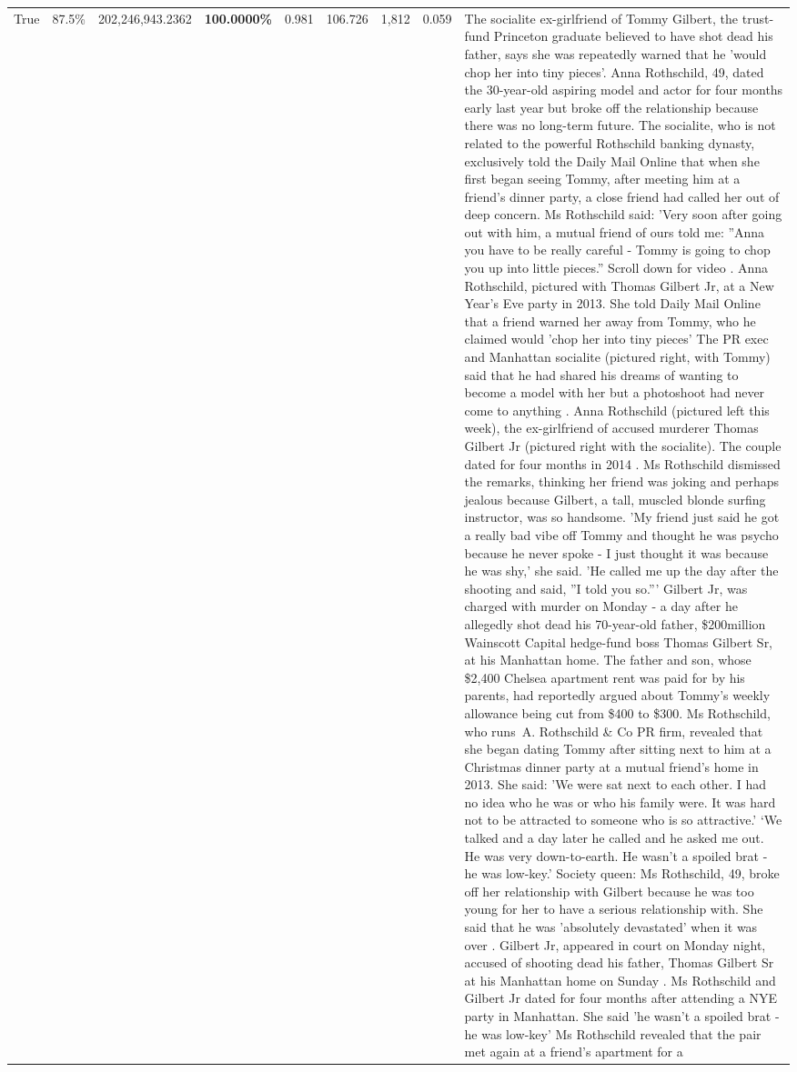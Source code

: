 \begin{table}[H]
\begin{tabular}{lllrlllll}
True & 87.5\% & 202,246,943.2362 & \bfseries \color{red} 100.0000\% & 0.981 & 106.726 & 1,812 & 0.059 & The socialite ex-girlfriend of Tommy Gilbert, the trust-fund Princeton graduate believed to have shot dead his father, says she was repeatedly warned that he 'would chop her into tiny pieces'. Anna Rothschild, 49, dated the 30-year-old aspiring model and actor for four months early last year but broke off the relationship because there was no long-term future. The socialite, who is not related to the powerful Rothschild banking dynasty, exclusively told the Daily Mail Online that when she first began seeing Tommy, after meeting him at a friend's dinner party, a close friend had called her out of deep concern. Ms Rothschild said: 'Very soon after going out with him, a mutual friend of ours told me: ''Anna you have to be really careful - Tommy is going to chop you up into little pieces.'' Scroll down for video . Anna Rothschild, pictured with Thomas Gilbert Jr, at a New Year's Eve party in 2013. She told Daily Mail Online that a friend warned her away from Tommy, who he claimed would 'chop her into tiny pieces' The PR exec and Manhattan socialite (pictured right, with Tommy) said that he had shared his dreams of wanting to become a model with her but a photoshoot had never come to anything . Anna Rothschild (pictured left this week), the ex-girlfriend of accused murderer Thomas Gilbert Jr (pictured right with the socialite). The couple dated for four months in 2014 . Ms Rothschild dismissed the remarks, thinking her friend was joking and perhaps jealous because Gilbert, a tall, muscled blonde surfing instructor, was so handsome. 'My friend just said he got a really bad vibe off Tommy and thought he was psycho because he never spoke - I just thought it was because he was shy,' she said. 'He called me up the day after the shooting and said, ''I told you so.''' Gilbert Jr, was charged with murder on Monday - a day after he allegedly shot dead his 70-year-old father, \$200million Wainscott Capital hedge-fund boss Thomas Gilbert Sr, at his Manhattan home. The father and son, whose \$2,400 Chelsea apartment rent was paid for by his parents, had reportedly argued about Tommy's weekly allowance being cut from \$400 to \$300. Ms Rothschild, who runs A. Rothschild \& Co PR firm, revealed that she began dating Tommy after sitting next to him at a Christmas dinner party at a mutual friend's home in 2013. She said: 'We were sat next to each other. I had no idea who he was or who his family were. It was hard not to be attracted to someone who is so attractive.' ‘We talked and a day later he called and he asked me out. He was very down-to-earth. He wasn’t a spoiled brat - he was low-key.’ Society queen: Ms Rothschild, 49, broke off her relationship with Gilbert because he was too young for her to have a serious relationship with. She said that he was 'absolutely devastated' when it was over . Gilbert Jr, appeared in court on Monday night, accused of shooting dead his father, Thomas Gilbert Sr at his Manhattan home on Sunday . Ms Rothschild and Gilbert Jr dated for four months after attending a NYE party in Manhattan. She said 'he wasn't a spoiled brat - he was low-key' Ms Rothschild revealed that the pair met again at a friend’s apartment for a 
\end{tabular}
\end{table}
